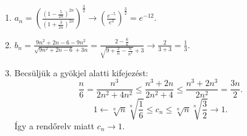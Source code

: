 \documentclass[11pt]{scrartcl}
\begin{document}
\begin{enumerate}
	\item \(\displaystyle
	      a_n
	      =
	      \left(
	      \frac{\left(1 - \frac{5}{2n}\right)^{2n}}{\left(1 + \frac{3}{2n}\right)^{2n}}
	      \right)^{\frac{3}{2}}
	      \to
	      \left( \frac{e^{-5}}{e^3} \right)^{\frac{3}{2}}
	      =
	      e^{-12}.
	      \)

	\item \(\displaystyle
	      b_n
	      =
	      \frac{9n^2 + 2n - 6 - 9n^2}{\sqrt{9n^2 + 2n - 6} + 3n}
	      =
	      \frac{2 - \frac{6}{n}}{\sqrt{9 + \frac{2}{n} - \frac{6}{n^2}} + 3}
	      \to
	      \frac{2}{3 + 3}
	      =
	      \frac{1}{3}.
	      \)

	\item Becsüljük a gyökjel alatti kifejezést:
	      \[
		      \frac{n}{6}
		      = \frac{n^3}{2n^2 + 4n^2}
		      \le \frac{n^3 + 2n}{2n^2 + 4}
		      \le \frac{n^3 + 2n^3}{2n^2}
		      = \frac{3n}{2}.
	      \]
	      \[
		      1 \leftarrow \sqrt[n]{n} \sqrt[n]{\frac{1}{6}}
		      \le c_n
		      \le \sqrt[n]{n} \sqrt[n]{\frac{3}{2}} \to 1.
	      \]
	      Így a rendőrelv miatt $c_n \to 1$.
\end{enumerate}
\end{document}
